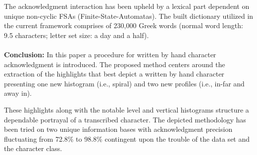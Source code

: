 \documentclass[12pt, conference]{IEEEtran}
\begin{document}
The acknowledgment interaction has been upheld by a lexical part dependent on unique non-cyclic FSAs (Finite-State-Automatas). The built dictionary utilized in the current framework comprises of 230,000 Greek words (normal word length: 9.5 characters; letter set size: a day and a half).\\
\textbf{}\\
\textbf{Conclusion:} In this paper a procedure for written by hand character acknowledgment is introduced. The proposed method centers around the extraction of the highlights that best depict a written by hand character presenting one new histogram (i.e., spiral) and two new profiles (i.e., in-far and away in).

These highlights along with the notable level and vertical histograms structure a dependable portrayal of a transcribed character. The depicted methodology has been tried on two unique information bases with acknowledgment precision fluctuating from 72.8\% to 98.8\% contingent upon the trouble of the data set and the character class.\\
\end{document}
